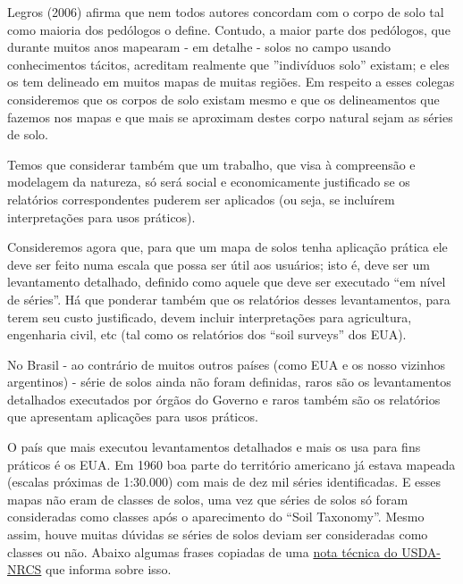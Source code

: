 Legros (2006) afirma que nem todos autores concordam com o corpo de solo tal como maioria dos pedólogos o define. Contudo, a maior parte dos pedólogos, que durante muitos anos mapearam - em detalhe - solos no campo usando conhecimentos tácitos, acreditam realmente que ''indivíduos solo'' existam; e eles os tem delineado em muitos mapas de muitas regiões. Em respeito a esses colegas consideremos que os corpos de solo existam mesmo e que os delineamentos que fazemos nos mapas e que mais se aproximam destes corpo natural sejam as séries de solo.

Temos que considerar também que um trabalho, que visa à compreensão e modelagem da natureza, só será social e economicamente justificado se os relatórios correspondentes puderem ser aplicados (ou seja, se incluírem interpretações para usos práticos).

Consideremos agora que, para que um mapa de solos tenha aplicação prática ele deve ser feito numa escala que possa ser útil aos usuários; isto é, deve ser um levantamento detalhado, definido como aquele que deve ser executado ``em nível de séries''. Há que ponderar também que os relatórios desses levantamentos, para terem seu custo justificado, devem incluir interpretações para agricultura, engenharia civil, etc (tal como os relatórios dos ``soil surveys'' dos EUA).

No Brasil - ao contrário de muitos outros países (como EUA e os nosso vizinhos argentinos) - série de solos ainda não foram definidas, raros são os levantamentos detalhados executados por órgãos do Governo e raros também são os relatórios que apresentam aplicações para usos práticos.

O país que mais executou levantamentos detalhados e mais os usa para fins práticos é os EUA. Em 1960 boa parte do território americano já estava mapeada (escalas próximas de 1:30.000) com mais de dez mil séries identificadas. E esses mapas não eram de classes de solos, uma vez que séries de solos só foram consideradas como classes após o aparecimento do ``Soil Taxonomy''. Mesmo assim, houve muitas dúvidas se séries de solos deviam ser consideradas como classes ou não. Abaixo algumas frases copiadas de uma \href{http://www.nrcs.usda.gov/wps/portal/nrcs/detail/soils/planners/?cid=nrcs142p2_053571}{nota técnica do USDA-NRCS} que informa sobre isso.

